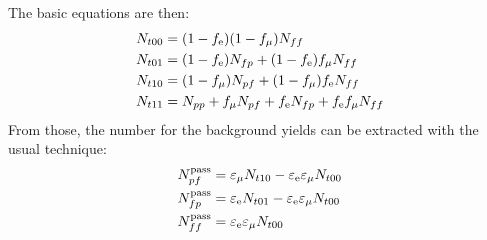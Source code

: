 The basic equations are then:
\begin{align*}
    N_{t00} &= (1 - f_{\mathrm{e}})(1 - f_{\mu}) N_{ff}\\
    N_{t01} &= (1 - f_{\mathrm{e}})N_{fp} + (1 - f_{\mathrm{e}})f_{\mu} N_{ff}\\
    N_{t10} &= (1 - f_{\mu})N_{pf} + (1 - f_{\mu})f_{\mathrm{e}} N_{ff}\\
    N_{t11} &= N_{pp} + f_{\mu} N_{pf} + f_{\mathrm{e}} N_{fp} + f_{\mathrm{e}} f_{\mu} N_{ff}
\end{align*}
From those, the number for the background yields can be extracted with the
usual technique:
\begin{align*}
    N_{pf}^\text{pass} &= \varepsilon_{\mu} N_{t10} - \varepsilon_{\mathrm{e}}
    \varepsilon_{\mu} N_{t00}\\
    N_{fp}^\text{pass} &= \varepsilon_{\mathrm{e}} N_{t01} -
    \varepsilon_{\mathrm{e}} \varepsilon_{\mu} N_{t00}\\
    N_{ff}^\text{pass} &= \varepsilon_{\mathrm{e}} \varepsilon_{\mu} N_{t00}
\end{align*}
